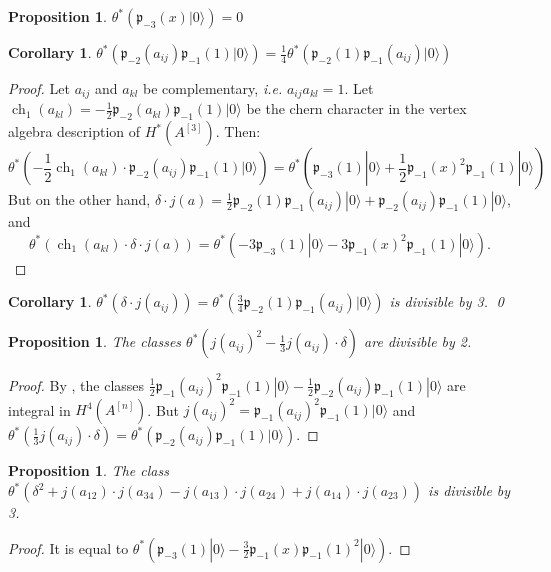 \documentclass{amsart}
\DeclareMathOperator{\ch}{ch}
\newcommand{\hilb}[1]{^{[#1]}}
\newcommand{\ie}{{\it i.e. }}
\newcommand{\vac}{|0\rangle}
\newcommand{\p}{\mathfrak{p}}
\newcommand{\pone}{ \mathfrak{p}_{ - 1} }
\theoremstyle{plain}
\newtheorem{proposition}[theorem]{Proposition}
\newtheorem{corollary}[theorem]{Corollary}
\theoremstyle{definition}
\theoremstyle{remark}
\begin{document}
\begin{proposition}
$\theta^*\left(\p_{-3}(x)\vac\right) =0$ 
\end{proposition}
\begin{corollary}
$\theta^* \left(\p_{-2}(a_{ij})\pone(1)\vac\right) = \frac{1}{4}\theta^*\left( \p_{-2}(1)\pone(a_{ij})\vac\right) $
\end{corollary}
\begin{proof}
Let  $a_{ij}$ and $a_{kl}$ be complementary, \ie $a_{ij}a_{kl}=1$. Let $\ch_1(a_{kl}) = -\frac{1}{2} \p_{-2}(a_{kl})\pone(1)\vac$ be the chern character in the vertex algebra description of $H^*(A\hilb{3})$. Then:
$$
\theta^*\left(-\frac{1}{2}\ch_1(a_{kl})\cdot\p_{-2}(a_{ij})\pone(1)\vac \right) =
\theta^*\left(\p_{-3}(1)\vac + \frac{1}{2}\pone(x)^2\pone(1)\vac \right)
$$
But on the other hand, $\delta \cdot j(a) = \frac{1}{2} \p_{-2}(1)\pone(a_{ij})\vac+\p_{-2}(a_{ij})\pone(1)\vac$, and
$$
\theta^*\left(\ch_1(a_{kl})\cdot \delta \cdot j(a)\right) =
\theta^*\left(-3\p_{-3}(1)\vac  - 3\pone(x)^2\pone(1)\vac \right).
$$
\end{proof}
\begin{corollary}
$\theta^*\left( \delta \cdot j(a_{ij}) \right) = \theta^*\left( \frac{3}{4} \p_{-2}(1)\pone(a_{ij})\vac\right)$ is divisible by 3. \qed
\end{corollary}
\begin{proposition}
The classes $\theta^*\left(j(a_{ij})^2 - \frac{1}{3}j(a_{ij})\cdot \delta\right)$ are divisible by 2.
\end{proposition}
\begin{proof}
By \cite{QinWang}, the classes $\frac{1}{2} \pone(a_{ij})^2\pone(1)\vac - \frac{1}{2}\p_{-2}(a_{ij})\pone(1)\vac$ are integral in $H^4(A\hilb{n})$. But $j(a_{ij})^2= \pone(a_{ij})^2\pone(1)\vac $ and $\theta^*\left(\frac{1}{3}j(a_{ij})\cdot\delta\right) =\theta^*\left(\p_{-2}(a_{ij})\pone(1)\vac\right)$.
\end{proof}


\begin{proposition}\label{DelSum3}
The class $\theta^*\left(\delta^2+j(a_{12})\cdot j(a_{34})-j(a_{13})\cdot j(a_{24})+j(a_{14})\cdot j(a_{23})\right)$ is divisible by 3.
\end{proposition}
\begin{proof}
It is equal to $\theta^*\left(\p_{-3}(1)\vac -\frac{3}{2}\pone(x)\pone(1)^2\vac \right)$.
\end{proof}
\end{document}
